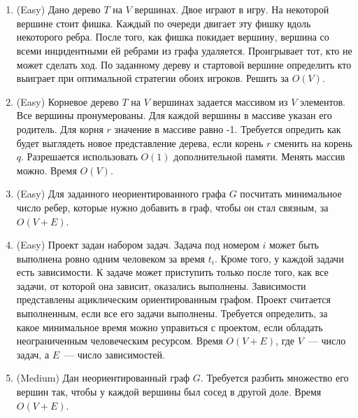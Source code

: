 \section{}

\begin{enumerate}

  \item (Easy) Дано дерево $T$ на $V$ вершинах. Двое играют в игру. На некоторой
  вершине стоит фишка. Каждый по очереди двигает эту фишку вдоль
  некоторого ребра. После того, как фишка покидает вершину, 
  вершина со всеми инцидентными ей ребрами из графа удаляется.
  Проигрывает тот, кто не может сделать ход. По заданному дереву
  и стартовой вершине определить кто выиграет при оптимальной 
  стратегии обоих игроков. Решить за $O(V)$.

  \item (Easy) Корневое дерево $T$ на $V$ вершинах задается массивом 
  из $V$ элементов. Все вершины пронумерованы. Для каждой вершины 
  в массиве указан его родитель.  Для корня $r$ значение в массиве
  равно -1. Требуется опредить как будет выглядеть новое представление 
  дерева, если корень $r$ сменить на корень $q$. Разрешается использовать
  $O(1)$ дополнительной памяти. Менять массив можно. Время $O(V)$.

  \item (Easy) Для заданного неориентированного графа $G$ посчитать
          минимальное число ребер, которые нужно добавить в граф, чтобы 
          он стал связным, за $O(V + E)$.

  \item (Easy) Проект задан набором задач. Задача под номером $i$ может
    быть выполнена ровно одним человеком за время $t_i$. Кроме того, у 
    каждой задачи есть зависимости. К задаче может приступить только 
    после того, как все задачи, от которой она зависит, оказались выполнены.
    Зависимости представлены ациклическим ориентированным графом. 
    Проект считается выполненным, если все его задачи выполнены.
    Требуется определить, за какое минимальное время можно управиться с проектом,
    если обладать неограниченным человеческим ресурсом. Время $O(V + E)$, где
    $V$~--- число задач, а $E$~--- число зависимостей.

  \item (Medium) Дан неориентированный граф $G$. Требуется разбить множество
      его вершин так, чтобы у каждой вершины был сосед в другой доле. Время
      $O(V + E)$.


\end{enumerate}
